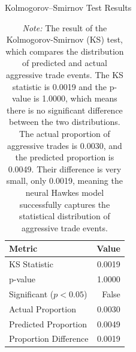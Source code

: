 \begin{table}[tbp]
    \centering
    \caption{Kolmogorov--Smirnov Test Results}
    \caption*{\textit{Note:} The result of the Kolmogorov-Smirnov (KS) test, which compares the distribution of predicted and actual aggressive trade events. The KS statistic is 0.0019 and the p-value is 1.0000, which means there is no significant difference between the two distributions. The actual proportion of aggressive trades is 0.0030, and the predicted proportion is 0.0049. Their difference is very small, only 0.0019, meaning the neural Hawkes model successfully captures the statistical distribution of aggressive trade events.}
    \label{tb:ks-test}
    \begin{tabular}{lr}
    \toprule
    \textbf{Metric} & \textbf{Value} \\
    \midrule
    KS Statistic & 0.0019 \\
    p-value & 1.0000 \\
    Significant ($p < 0.05$) & False \\
    Actual Proportion & 0.0030 \\
    Predicted Proportion & 0.0049 \\
    Proportion Difference & 0.0019 \\
    \bottomrule
    \end{tabular}
\end{table}




